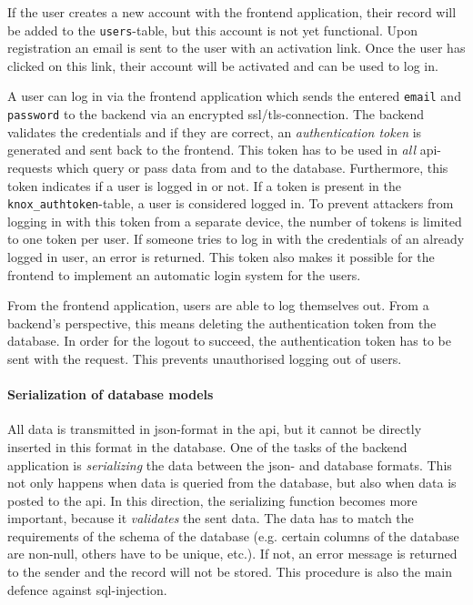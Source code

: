 \ind If the user creates a new account with the frontend application, their record will be added to the \texttt{users}-table, but this account is not yet functional. Upon registration an email is sent to the user with an activation link. Once the user has clicked on this link, their account will be activated and can be used to log in.

\ind A user can log in via the frontend application which sends the entered \texttt{email} and \texttt{password} to the backend via an encrypted \ac{ssl}/\ac{tls}-connection. The backend validates the credentials and if they are correct, an \textit{authentication token} is generated and sent back to the frontend. This token has to be used in \textit{all} \ac{api}-requests which query or pass data from and to the database. Furthermore, this token indicates if a user is logged in or not. If a token is present in the \verb|knox_authtoken|-table, a user is considered logged in. To prevent attackers from logging in with this token from a separate device, the number of tokens is limited to one token per user. If someone tries to log in with the credentials of an already logged in user, an error is returned. This token also makes it possible for the frontend to implement an automatic login system for the users.

\ind From the frontend application, users are able to log themselves out. From a backend's perspective, this means deleting the authentication token from the database. In order for the logout to succeed, the authentication token has to be sent with the request. This prevents unauthorised logging out of users. 

\paragraph{Serialization of database models}\label{sec:backend-serialization}
All data is transmitted in \ac{json}-format in the \ac{api}, but it cannot be directly inserted in this format in the database. One of the tasks of the backend application is \textit{serializing} the data between the \ac{json}- and database formats. This not only happens when data is queried from the database, but also when data is posted to the \ac{api}. In this direction, the serializing function becomes more important, because it \textit{validates} the sent data. The data has to match the requirements of the schema of the database (e.g. certain columns of the database are non-null, others have to be unique, etc.). If not, an error message is returned to the sender and the record will not be stored. This procedure is also the main defence against \ac{sql}-injection.

